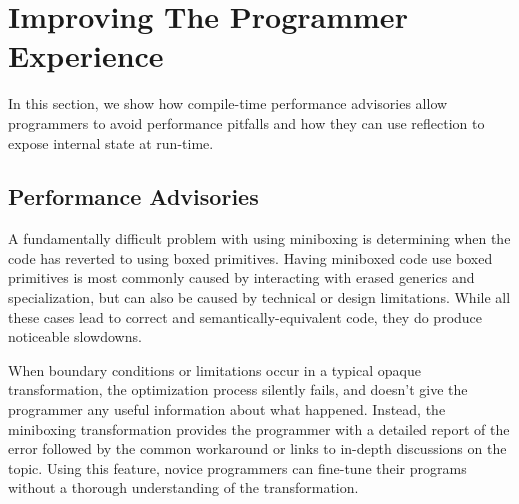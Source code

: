 \section{Improving The Programmer Experience}
\label{sec:advisories}

In this section, we show how compile-time performance advisories allow programmers to avoid performance pitfalls and how they can use reflection to expose internal state at run-time. %

\subsection{Performance Advisories}

A fundamentally difficult problem with using miniboxing is determining when the code has reverted to using boxed primitives. Having miniboxed code use boxed primitives is most commonly caused by interacting with erased generics and specialization, but can also be caused by technical or design limitations. While all these cases lead to correct and semantically-equivalent code, they do produce noticeable slowdowns. %

When boundary conditions or limitations occur in a typical opaque transformation, the optimization process silently fails, and doesn't give the programmer any useful information about what happened. Instead, the miniboxing transformation provides the programmer with a detailed report of the error followed by the common workaround or links to in-depth discussions on the topic. Using this feature, novice programmers can fine-tune their programs without a thorough understanding of the transformation. %

